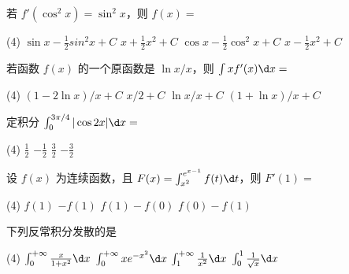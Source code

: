 \documentclass[quiet]{ctexart}
\begin{document}
\begin{problem}
  若 $f'(\cos^2x) = \sin^2x$，则 $f(x) = $
  \begin{tasks}(4)
    \task $\sin x - \frac12 sin^2 x + C$
    \task $x + \frac12 x^2 + C$
    \task $\cos x - \frac12 \cos^2 x + C$
    \task $x - \frac12 x^2 + C$
  \end{tasks}
\end{problem}
\begin{solution}

\end{solution}

\begin{problem}
  若函数 $f(x)$ 的一个原函数是 $\ln x/x$，则 $\int xf'(x) \d x = $
  \begin{tasks}(4)
    \task $(1 - 2\ln x)/x + C$
    \task $x/2 + C$
    \task $\ln x/x + C$
    \task $(1 + \ln x)/x + C$
  \end{tasks}
\end{problem}
\begin{solution}

\end{solution}

\begin{problem}
  定积分 $\int_0^{3\pi/4} |\cos 2x| \d x = $
  \begin{tasks}(4)
    \task $\frac12$
    \task $-\frac12$
    \task $\frac32$
    \task $-\frac32$
  \end{tasks}
\end{problem}
\begin{solution}

\end{solution}

\begin{problem}
  设 $f(x)$ 为连续函数，且 $F(x) = \int_{x^2}^{e^{x - 1}} f(t) \d t$，则 $F'(1) = $
  \begin{tasks}(4)
    \task $f(1)$
    \task $-f(1)$
    \task $f(1) - f(0)$
    \task $f(0) - f(1)$
  \end{tasks}
\end{problem}
\begin{solution}

\end{solution}

\begin{problem}
  下列反常积分发散的是
  \begin{tasks}(4)
    \task $\int_0^{+\infty} \frac{x}{1 + x^2} \d x$
    \task $\int_0^{+\infty} xe^{-x^2} \d x$
    \task $\int_1^{+\infty} \frac1{x^2} \d x$
    \task $\int_0^1 \frac{1}{\sqrt x} \d x$
  \end{tasks}
\end{problem}
\begin{solution}

\end{solution}
\end{document}
